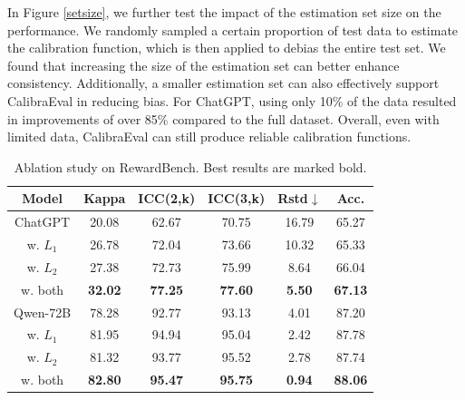 \documentclass[sigconf]{acmart}
\begin{document}
In Figure \ref{setsize}, we further test the impact of the estimation set size on the performance.
We randomly sampled a certain proportion of test data to estimate the calibration function, which is then applied to debias the entire test set. 
We found that increasing the size of the estimation set can better enhance consistency. Additionally, a smaller estimation set can also effectively support CalibraEval in reducing bias. For ChatGPT, using only 10\% of the data resulted in improvements of over 85\% compared to the full dataset.  
Overall, even with limited data, CalibraEval can still produce reliable calibration functions.




\begin{table}[t]
\caption{Ablation study on RewardBench. Best results are marked bold.}
\begin{tabular}{c|ccccc}
\hline
Model       & Kappa          & ICC(2,k)       & ICC(3,k)       & Rstd$\downarrow$          & Acc.           \\ \hline
ChatGPT     & 20.08          & 62.67          & 70.75          & 16.79         & 65.27          \\
w. $L_1$& 26.78          & 72.04          & 73.66          & 10.32         & 65.33          \\
w. $L_2$ & 27.38          & 72.73          & 75.99          & 8.64          & 66.04          \\
w. both      & \textbf{32.02} & \textbf{77.25} & \textbf{77.60} & \textbf{5.50} & \textbf{67.13} \\ \hline
Qwen-72B    & 78.28          & 92.77          & 93.13          & 4.01          & 87.20          \\
w. $L_1$ & 81.95          & 94.94          & 95.04          & 2.42          & 87.78          \\
w. $L_2$ & 81.32          & 93.77          & 95.52          & 2.78          & 87.74          \\
w. both      & \textbf{82.80}  & \textbf{95.47} & \textbf{95.75} & \textbf{0.94} & \textbf{88.06} \\ \hline
\end{tabular}


\label{abla}
\end{table}
\end{document}
